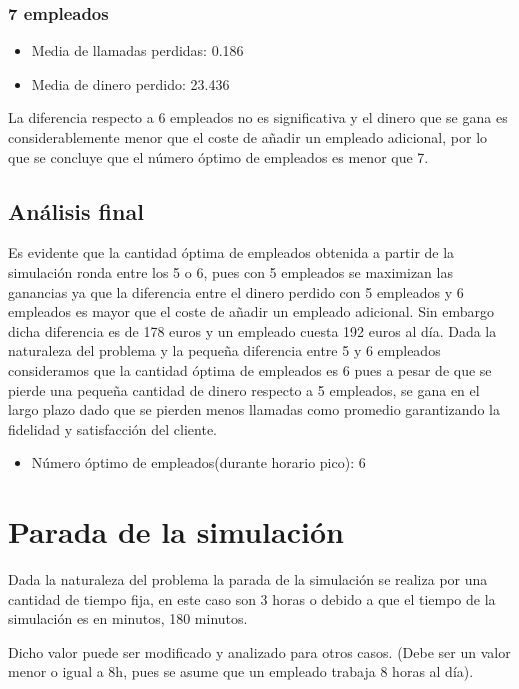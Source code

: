 \documentclass{article}
\begin{document}
\subsubsection*{7 empleados}

\begin{itemize}
    \item Media de llamadas perdidas: 0.186
    \item Media de dinero perdido: 23.436
\end{itemize}

La diferencia respecto a 6 empleados no es significativa y el dinero que se gana es considerablemente menor que el coste de añadir un empleado adicional, por lo que se concluye que el número óptimo de empleados es menor que 7.

\subsection*{Análisis final}

Es evidente que la cantidad óptima de empleados obtenida a partir de la simulación ronda entre los 5 o 6, pues con 5 empleados se maximizan las ganancias ya que la diferencia entre el dinero perdido con 5 empleados y 6 empleados es mayor que el coste de añadir un empleado adicional.
Sin embargo dicha diferencia es de 178 euros y un empleado cuesta 192 euros al día. Dada la naturaleza del problema y la pequeña diferencia entre 5 y 6 empleados consideramos que la cantidad óptima de empleados es 6 pues a pesar de que se pierde una pequeña cantidad de dinero respecto a 5 empleados, se gana en el largo plazo dado que se pierden menos llamadas como promedio garantizando la fidelidad y satisfacción del cliente.
\begin{itemize}
    \item Número óptimo de empleados(durante horario pico): 6
\end{itemize}

\section{Parada de la simulación}
Dada la naturaleza del problema la parada de la simulación se realiza por una cantidad de tiempo fija, en este caso son 3 horas o debido a que el tiempo de la simulación es en minutos, 180 minutos.

Dicho valor puede ser modificado y analizado para otros casos. (Debe ser un valor menor o igual a 8h, pues se asume que un empleado trabaja 8 horas al día).
\end{document}
